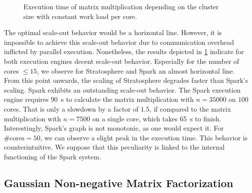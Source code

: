 \begin{figure}[!h]
	\centering
	\caption{Execution time of matrix multiplication depending on the cluster size with constant work load per core.}
	\label{fig:mmNodesRuntime}
\end{figure}

The optimal scale-out behavior would be a horizontal line.
However, it is impossible to achieve this scale-out behavior due to communication overhead inflicted by parallel execution.
Nonetheless, the results depicted in \cref{fig:mmNodesRuntime} indicate for both execution engines decent scale-out behavior.
Especially for the number of cores $\le 15$, we observe for Stratosphere and Spark an almost horizontal line.
From this point onwards, the scaling of Stratosphere degrades faster than Spark's scaling.
Spark exhibits an outstanding scale-out behavior.
The Spark execution engine requires \SI{90}{\second} to calculate the matrix multiplication with $n=35000$ on $100$ cores.
That is only a slowdown by a factor of $1.5$, if compared to the matrix multiplication with $n=7500$ on a single core, which takes \SI{65}{\second} to finish.
Interestingly, Spark's graph is not monotonic, as one would expect it.
For $\text{\#cores}=50$, we can observe a slight peak in the execution time.
This behavior is counterintuitive.
We suppose that this peculiarity is linked to the internal functioning of the Spark system.

\subsection{Gaussian Non-negative Matrix Factorization}
\label{subsec:NMF}

